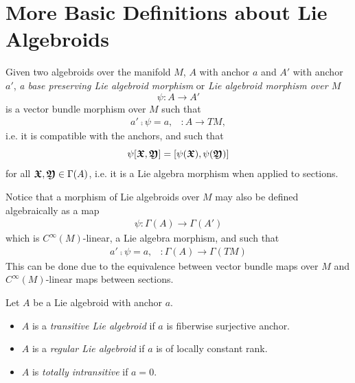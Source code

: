 \section{More Basic Definitions about Lie Algebroids}
\begin{definition}  \label{defnMorph}
Given two algebroids over the manifold $M$, $A$ with anchor $a$ and $A'$ with anchor $a'$, \emph{a base preserving Lie algebroid morphism} or \emph{Lie algebroid morphism over $M$} 
\[\psi: A \to A'\]
is a vector bundle morphism over $M$ such that 
\begin{align}
    a' \comp \psi = a, & : A \to TM,
\end{align}
i.e. it is compatible with the anchors, and such that 
\[\psi[\bm{\mathfrak{X}}, \bm{\mathfrak{Y}}] = [\psi(\bm{\mathfrak{X}}), \psi(\bm{\mathfrak{Y}})]\] 
for all $\bm{\mathfrak{X}}, \bm{\mathfrak{Y}} \in \Gamma(A)$, i.e. it is a Lie algebra morphism when applied to sections. 
\end{definition}

\begin{remark}
Notice that a morphism of Lie algebroids over $M$ may also be defined algebraically as a map
\begin{align*}
    \psi: \Gamma(A) \to \Gamma(A')
\end{align*}
which is $C^\infty(M)$-linear, a Lie algebra morphism, and such that
\begin{align*}
    a' \comp \psi = a, & :\Gamma(A) \to \Gamma(TM)
\end{align*}
This can be done due to the equivalence between vector bundle maps over $M$ and $C^\infty(M)$-linear maps between sections.
\end{remark}

\begin{definition}
    Let $A$ be a Lie algebroid with anchor $a$.
    
    \begin{itemize}
    
    \item $A$ is a \emph{transitive Lie algebroid} if $a$ is fiberwise surjective anchor.
    
    \item $A$ is a \emph{regular Lie algebroid} if $a$ is of locally constant rank.
    
    \item $A$ is \emph{totally intransitive} if $a = 0$.
    
    \end{itemize}
    
\end{definition}

